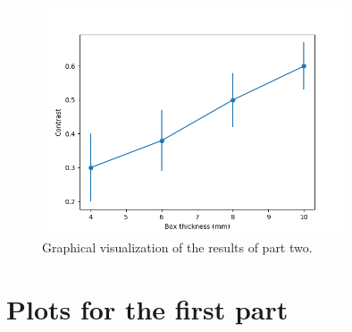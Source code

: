 \documentclass[a4paper]{article}
\begin{document}
\begin{figure}[!htb]
  \centering
  \includegraphics[width=0.8\textwidth]{plots/contrast.png}
  \caption{Graphical visualization of the results of part two.}
  \label{fig:results_two}
\end{figure}

\clearpage


\appendix

\section{Plots for the first part}
\label{sec:appendix_1}
\end{document}
